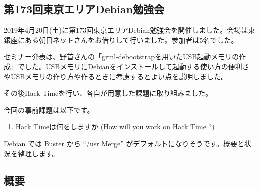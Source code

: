 \documentclass[mingoth,a4paper]{jsarticle}
\begin{document}

\subsection{第173回東京エリアDebian勉強会}

2019年4月20日(土)に第173回東京エリアDebian勉強会を開催しました。会場は東銀座にある朝日ネットさんをお借りして行いました。参加者は5名でした。

セミナー発表は、野首さんの「grml-debootstrapを用いたUSB起動メモリの作成」でした。USBメモリにDebianをインストールして起動する使い方の便利さやUSBメモリの作り方や作るときに考慮するとよい点を説明しました。

その後Hack Timeを行い、各自が用意した課題に取り組みました。



今回の事前課題は以下です。

\begin{enumerate}
\item Hack Timeは何をしますか (How will you work on Hack Time ?)
\end{enumerate}


\begin{multicols}{2}
{\small

}
\end{multicols}

%
%
%
%




Debian では Buster から ``/usr Merge'' がデフォルトになりそうです。概要と状況を整理します。

\subsection{概要}
\end{document}
